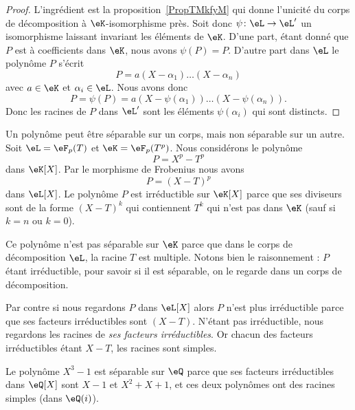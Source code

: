 \begin{proof}
	L'ingrédient est la proposition~\ref{PropTMkfyM} qui donne l'unicité du corps de décomposition à \( \eK\)-isomorphisme près. Soit donc \( \psi\colon \eL\to \eL'\) un isomorphisme laissant invariant les éléments de \( \eK\). D'une part, étant donné que \( P\) est à coefficients dans \( \eK\), nous avons \( \psi(P)=P\). D'autre part dans \( \eL\) le polynôme \( P\) s'écrit
	\begin{equation}
		P=a(X-\alpha_1)\ldots (X-\alpha_n)
	\end{equation}
	avec \( a\in \eK\) et \( \alpha_i\in \eL\). Nous avons donc
	\begin{equation}
		P=\psi(P)=a(X-\psi(\alpha_1))\ldots (X-\psi(\alpha_n)).
	\end{equation}
	Donc les racines de \( P\) dans \( \eL'\) sont les éléments \( \psi(\alpha_i)\) qui sont distincts.
\end{proof}

\begin{example}
	Un polynôme peut être séparable sur un corps, mais non séparable sur un autre. Soit \( \eL=\eF_p(T)\) et \( \eK=\eF_p(T^p)\). Nous considérons le polynôme
	\begin{equation}
		P=X^p-T^p
	\end{equation}
	dans \( \eK[X]\). Par le morphisme de Frobenius nous avons
	\begin{equation}
		P=(X-T)^p
	\end{equation}
	dans \( \eL[X]\). Le polynôme \( P\) est irréductible sur \( \eK[X]\) parce que ses diviseurs sont de la forme \( (X-T)^k\) qui contiennent \( T^k\) qui n'est pas dans \( \eK\) (sauf si \( k=n\) ou \( k=0\)).

	Ce polynôme n'est pas séparable sur \( \eK\) parce que dans le corps de décomposition \( \eL\), la racine \( T\) est multiple. Notons bien le raisonnement : \( P\) étant irréductible, pour savoir si il est séparable, on le regarde dans un corps de décomposition.

	Par contre si nous regardons \( P\) dans \( \eL[X]\) alors \( P\) n'est plus irréductible parce que ses facteurs irréductibles sont \( (X-T)\). N'étant pas irréductible, nous regardons les racines de \emph{ses facteurs irréductibles}. Or chacun des facteurs irréductibles étant \( X-T\), les racines sont simples.
\end{example}

\begin{example}
	Le polynôme \( X^3-1\) est séparable sur \( \eQ\) parce que ses facteurs irréductibles dans \( \eQ[X]\) sont \( X-1\) et \(X^2 + X + 1\), et ces deux polynômes ont des racines simples (dans \( \eQ(i)\)).
\end{example}


